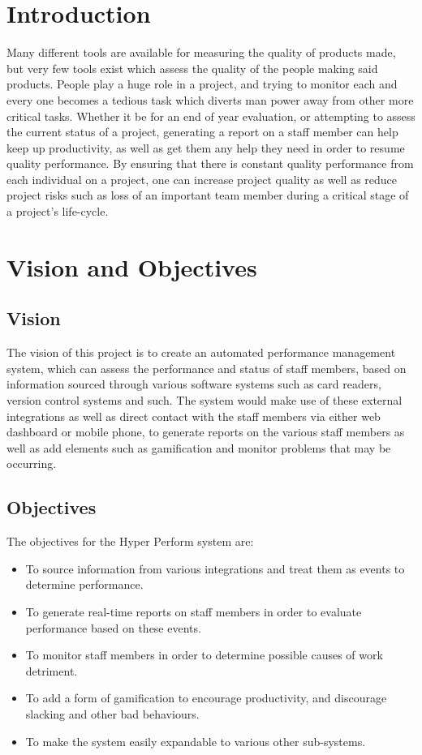 \documentclass[11pt,a4paper]{article}
\begin{document}
\thispagestyle{empty}
\pagebreak

\tableofcontents
\pagebreak

\section{Introduction}
Many different tools are available for measuring the quality of products made, but very few tools exist which assess the quality of the people making said products. People play a huge role in a project, and trying to monitor each and every one becomes a tedious task which diverts man power away from other more critical tasks. Whether it be for an end of year evaluation, or attempting to assess the current status of a project, generating a report on a staff member can help keep up productivity, as well as get them any help they need in order to resume quality performance. By ensuring that there is constant quality performance from each individual on a project, one can increase project quality as well as reduce project risks such as loss of an important team member during a critical stage of a project's life-cycle. 

\section{Vision and Objectives}
\subsection{Vision}
The vision of this project is to create an automated performance management system, which can assess the performance and status of staff members, based on information sourced through various software systems such as card readers, version control systems and such. The system would make use of these external integrations as well as direct contact with the staff members via either web dashboard or mobile phone, to generate reports on the various staff members as well as add elements such as gamification and monitor problems that may be occurring.

\subsection{Objectives}
The objectives for the Hyper Perform system are:
\begin{itemize}
	\item To source information from various integrations and treat them as events to determine performance.
	\item To generate real-time reports on staff members in order to evaluate performance based on these events.
	\item To monitor staff members in order to determine possible causes of work detriment.
	\item To add a form of gamification to encourage productivity, and discourage slacking and other bad behaviours.
	\item To make the system easily expandable to various other sub-systems.
\end{itemize}
\end{document}
